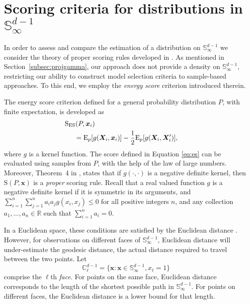 \section{Scoring criteria for distributions in ${\mathbb S}_\infty^{d-1}$\label{sec:evaluation}}

In order to assess and compare the estimation of a distribution on ${\mathbb S}_\infty^{d-1}$ we consider 
    the theory of proper scoring rules developed in \cite{gneiting2007}. As mentioned in 
    Section~\ref{subsec:projgamma}, our approach does not provide a density on 
    ${\mathbb S}_{\infty}^{d-1}$, restricting our ability to construct model selection criteria 
    to sample-based approaches.  To this end, we employ the \emph{energy score} criterion introduced
    therein.

The energy score criterion defined for a general probability distribution $P$, with finite expectation, 
    is developed as
    \begin{equation}
    \label{eq:es}
    \begin{aligned}
    &\hspace{-0.5cm}\text{S}_{\text{ES}}\left(P, \bm{x}_i\right) \\
    &=\text{E}_p \left[g\left(\bm{X}_i, \bm{x}_i\right)\right] -
                                    \frac{1}{2}\text{E}_p \left[g\left(\bm{X}_i,\bm{X}_i^{\prime}\right)\right],
    \end{aligned}
    \end{equation}
where $g$ is a kernel function. The score defined in Equation \eqref{eq:es} can be evaluated
  using samples from $P$, with the help of the law of large numbers.
  Moreover, Theorem~4 in \cite{gneiting2007}, states that if $g(\cdot,\cdot)$ is a negative 
  definite kernel, then $\text{S}(P,\bm{x})$ is a \emph{proper} scoring rule.  Recall that a 
  real valued function $g$ is a negative definite kernel if it is symmetric in its arguments, 
  and $\sum_{i=1}^n\sum_{j=1}^na_ia_jg(x_i,x_j)\leq 0$ for all positive integers $n$, and any 
  collection $a_1,\ldots,a_n\in{\mathbb R}$ such that  $\sum_{i = 1}^na_i = 0$.  

In a Euclidean space, these conditions are satisfied by the Euclidean distance \citep{berg1984}. 
    However, for observations on different faces of ${\mathbb S}_{\infty}^{d-1}$, Euclidean 
    distance will under-estimate the geodesic distance, the actual distance required to travel 
    between the two points.  Let
\begin{equation*}
    {\mathbb C}_{\ell}^{d-1} = \lbrace \bm{x} : \bm{x} \in {\mathbb S}_{\infty}^{d-1}, x_{\ell} = 1\rbrace
\end{equation*}
    comprise the $\ell$th \emph{face}.  For points on the same face, Euclidean distance 
    corresponds to the length of the shortest possible path in ${\mathbb S}_{\infty}^{d-1}$.  
    For points on different faces, the Euclidean distance is a lower bound for that length.

